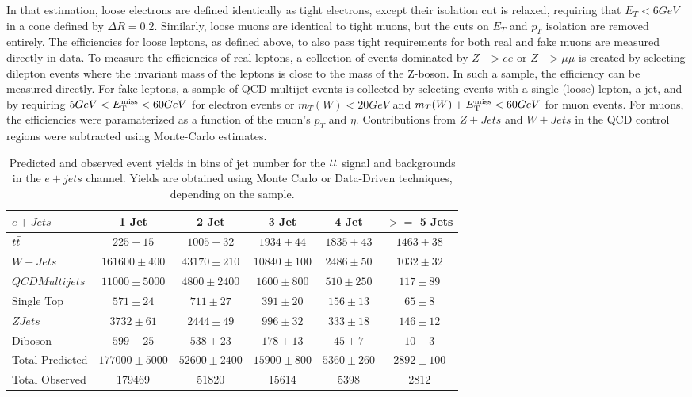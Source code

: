 In that estimation, loose electrons are defined identically as tight electrons, except their isolation cut is relaxed, requiring that $E_{T} < 6 GeV$ in a cone defined by $\Delta R = 0.2$.
Similarly, loose muons are identical to tight muons, but the cuts on $E_{T}$ and $p_{T}$ isolation are removed entirely.
The efficiencies for loose leptons, as defined above, to also pass tight requirements for both real and fake muons are measured directly in data.
To measure the efficiencies of real leptons, a collection of events dominated by $Z->ee$ or $Z->\mu\mu$ is created by selecting dilepton events where the invariant mass of the leptons is close to the mass of the Z-boson.
In such a sample, the efficiency can be measured directly.
For fake leptons, a sample of QCD multijet events is collected by selecting events with a single (loose) lepton, a jet, and by requiring $5 GeV < E_{\mathrm{T}}^{\mathrm{miss}} <  60 GeV$ for electron events or $m_{T}(W) < 20 GeV$ and $m_{T}(W) + E_{\mathrm{T}}^{\mathrm{miss}} < 60 GeV$ for muon events.
For muons, the efficiencies were paramaterized as a function of the muon's $p_{T}$ and $\eta$.
Contributions from $Z+Jets$ and $W+Jets$ in the QCD control regions were subtracted using Monte-Carlo estimates.

\begin{table}
  \begin{tabular}{lccccc}
    \hline
    $e + Jets$ & 1 Jet & 2 Jet & 3 Jet & 4 Jet & $>=$ 5 Jets \\ 
    \hline
    $t\bar{t}$ & $225 \pm 15$ & $1005 \pm 32$ & $1934 \pm 44$ & $1835 \pm 43$ & $1463 \pm 38$ \\
    $W+Jets$ & $161600 \pm 400$ & $43170 \pm 210$ & $10840 \pm 100$ & $2486 \pm 50$ & $1032 \pm 32$ \\
    $QCD Multijets$ & $11000 \pm 5000$ & $4800 \pm 2400$ & $1600 \pm 800$ & $510 \pm 250$ & $117 \pm 89$ \\
    Single Top & $571 \pm 24$ & $711 \pm 27$ & $391 \pm 20$ & $156 \pm 13$ & $65 \pm 8$ \\
    $ZJets$ & $3732 \pm 61$ & $2444 \pm 49$ & $996 \pm 32$ & $333 \pm 18$ & $146 \pm 12$ \\
    Diboson & $599 \pm 25$ & $538 \pm 23$ & $178 \pm 13$ & $45 \pm 7$ & $10 \pm 3$ \\
    \hline
    Total Predicted & $177000 \pm 5000$ & $52600 \pm 2400$ & $15900 \pm 800$ & $5360 \pm 260$ & $2892 \pm 100$ \\
    Total Observed & 179469 & 51820 & 15614 & 5398 & 2812 \\
    \hline
  \end{tabular}
  \caption{Predicted and observed event yields in bins of jet number for the $t\bar{t}$ signal and backgrounds in the $e+jets$ channel.  Yields are obtained using Monte Carlo or Data-Driven techniques, depending on the sample.}
\end{table}

